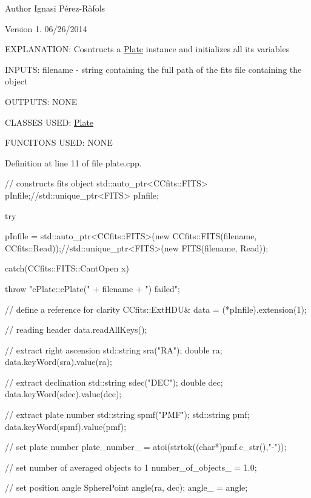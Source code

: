 \begin{DoxyAuthor}{Author}
Ignasi Pérez-\/\-Ràfols 
\end{DoxyAuthor}
\begin{DoxyVersion}{Version}
1. 06/26/2014 
\end{DoxyVersion}
E\-X\-P\-L\-A\-N\-A\-T\-I\-O\-N\-: Cosntructs a \hyperlink{class_plate}{Plate} instance and initializes all its variables

I\-N\-P\-U\-T\-S\-: filename -\/ string containing the full path of the fits file containing the object

O\-U\-T\-P\-U\-T\-S\-: N\-O\-N\-E

C\-L\-A\-S\-S\-E\-S U\-S\-E\-D\-: \hyperlink{class_plate}{Plate}

F\-U\-N\-C\-I\-T\-O\-N\-S U\-S\-E\-D\-: N\-O\-N\-E

Definition at line 11 of file plate.\-cpp.


\begin{DoxyCode}
                                     {
    // constructs fits object
    std::auto_ptr<CCfits::FITS> pInfile;//std::unique_ptr<FITS> pInfile;
    
    try{
        
        pInfile = std::auto_ptr<CCfits::FITS>(new CCfits::FITS(filename, 
      CCfits::Read));//std::unique_ptr<FITS>(new FITS(filename, Read));
        
    } catch(CCfits::FITS::CantOpen x) {
        
        throw "cPlate::cPlate(" + filename + ") failed";
    }

    // define a reference for clarity
    CCfits::ExtHDU& data = (*pInfile).extension(1);
    
    // reading header
    data.readAllKeys();
    
    // extract right ascension
    std::string sra("RA");
    double ra;
    data.keyWord(sra).value(ra);
    
    // extract declination
    std::string sdec("DEC");
    double dec;
    data.keyWord(sdec).value(dec);
    
    // extract plate number
    std::string spmf("PMF");
    std::string pmf;
    data.keyWord(spmf).value(pmf);
    
    // set plate number
    plate_number_ = atoi(strtok((char*)pmf.c_str(),"-"));
    
    // set number of averaged objects to 1
    number_of_objects_ = 1.0;
    
    // set position angle
    SpherePoint angle(ra, dec);
    angle_ = angle;
}
\end{DoxyCode}


